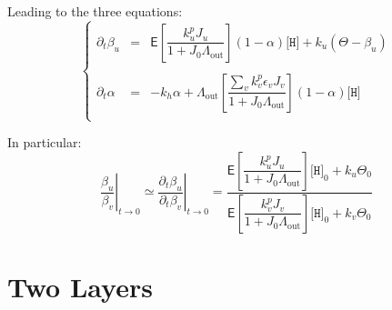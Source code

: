 \documentclass[aps,onecolumn,11pt]{revtex4}
\newcommand{\mychem}[1]{\mathtt{#1}}
\newcommand{\myconc}[1]{\big[#1\big]}
\newcommand{\spproton}{\mychem{H}}
\newcommand{\proton}{\myconc{\spproton}}
\newcommand{\myout}[1]{{#1}_{\mathrm{out}}}
\newcommand{\LiAll}{\Lambda}
\newcommand{\LiAllOut}{\myout{\LiAll}}
\begin{document}
Leading to the three equations:
\begin{equation}
\left\lbrace
\begin{array}{rcl}
	\partial_t \beta_u & = & \mathsf{E} \left[\dfrac{k^p_u J_u}{1+J_0 \LiAllOut}\right] \left(1-\alpha\right) \proton
	 + k_u \left( \Theta - \beta_u\right)\\
	\\
	\partial_t \alpha  & = &  -k_h\alpha + \LiAllOut \left[\dfrac{ \sum_v k^p_v \epsilon_v J_v}{1+J_0\LiAllOut}\right] \left(1-\alpha\right) \proton\\
\end{array}
\right.
\end{equation}

In particular:
\begin{equation}
\label{eq:level1}
	\left.\dfrac{\beta_u}{\beta_v}\right\vert_{t\to0} \simeq \left.\dfrac{\partial_t \beta_u}{\partial_t\beta_v}\right\vert_{t\to0}
	= \dfrac{\mathsf{E} \left[\dfrac{k^p_u J_u}{1+J_0 \LiAllOut}\right] \proton_0 + k_u  \Theta_0
	}
	{
	\mathsf{E} \left[\dfrac{k^p_v J_v}{1+J_0 \LiAllOut}\right] \proton_0 + k_v  \Theta_0
	}
\end{equation}


\section{Two Layers}
\end{document}

